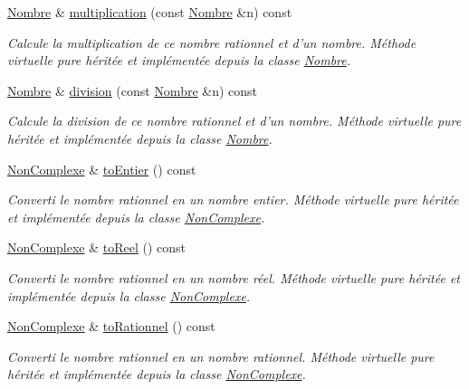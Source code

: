\begin{DoxyCompactItemize}
\hyperlink{classNombre}{\-Nombre} \& \hyperlink{classRationnel_a08cda12f3d5f7ed92a4a133ad2cf0b31}{multiplication} (const \hyperlink{classNombre}{\-Nombre} \&n) const 
\begin{DoxyCompactList}\small\item\em \-Calcule la multiplication de ce nombre rationnel et d'un nombre. \-Méthode virtuelle pure héritée et implémentée depuis la classe \hyperlink{classNombre}{\-Nombre}. \end{DoxyCompactList}\item 
\hyperlink{classNombre}{\-Nombre} \& \hyperlink{classRationnel_a7797b234a41853c34db9a7bae8b77538}{division} (const \hyperlink{classNombre}{\-Nombre} \&n) const 
\begin{DoxyCompactList}\small\item\em \-Calcule la division de ce nombre rationnel et d'un nombre. \-Méthode virtuelle pure héritée et implémentée depuis la classe \hyperlink{classNombre}{\-Nombre}. \end{DoxyCompactList}\item 
\hyperlink{classNonComplexe}{\-Non\-Complexe} \& \hyperlink{classRationnel_ab828112026340067e5b938b94fcbe110}{to\-Entier} () const 
\begin{DoxyCompactList}\small\item\em \-Converti le nombre rationnel en un nombre entier. \-Méthode virtuelle pure héritée et implémentée depuis la classe \hyperlink{classNonComplexe}{\-Non\-Complexe}. \end{DoxyCompactList}\item 
\hyperlink{classNonComplexe}{\-Non\-Complexe} \& \hyperlink{classRationnel_aae5902c11285baa3f2a48fbb94cfa006}{to\-Reel} () const 
\begin{DoxyCompactList}\small\item\em \-Converti le nombre rationnel en un nombre réel. \-Méthode virtuelle pure héritée et implémentée depuis la classe \hyperlink{classNonComplexe}{\-Non\-Complexe}. \end{DoxyCompactList}\item 
\hyperlink{classNonComplexe}{\-Non\-Complexe} \& \hyperlink{classRationnel_abee7f0032fc3edb4e0e4922174f988c9}{to\-Rationnel} () const 
\begin{DoxyCompactList}\small\item\em \-Converti le nombre rationnel en un nombre rationnel. \-Méthode virtuelle pure héritée et implémentée depuis la classe \hyperlink{classNonComplexe}{\-Non\-Complexe}. \end{DoxyCompactList}\item 

\end{DoxyCompactItemize}

